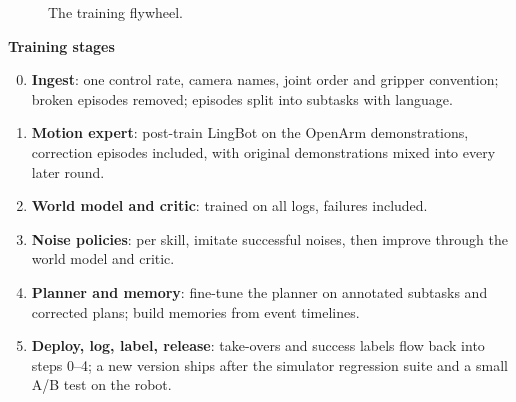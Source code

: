 \documentclass[11pt,a4paper]{article}
\newcommand{\sub}[1]{\par\needspace{4\baselineskip}\smallskip\noindent\textbf{#1}\par}
\begin{document}
\begin{figure}[!htbp]\centering
{}
\caption{The training flywheel.}
\label{fig:fly}
\end{figure}

\sub{Training stages}
\begin{enumerate}
\setcounter{enumi}{-1}
\item \textbf{Ingest}: one control rate, camera names, joint order and gripper convention; broken episodes removed; episodes split into subtasks with language.
\item \textbf{Motion expert}: post-train LingBot on the OpenArm demonstrations, correction episodes included, with original demonstrations mixed into every later round.
\item \textbf{World model and critic}: trained on all logs, failures included.
\item \textbf{Noise policies}: per skill, imitate successful noises, then improve through the world model and critic.
\item \textbf{Planner and memory}: fine-tune the planner on annotated subtasks and corrected plans; build memories from event timelines.
\item \textbf{Deploy, log, label, release}: take-overs and success labels flow back into steps 0--4; a new version ships after the simulator regression suite and a small A/B test on the robot.
\end{enumerate}
\end{document}
